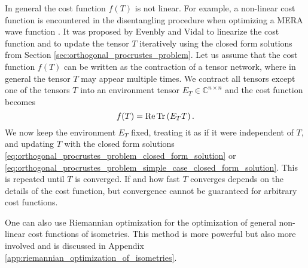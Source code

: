 In general the cost function $f(T)$ is not linear. For example, a non-linear cost function is encountered in the disentangling procedure when optimizing a MERA wave function \cite{cite:algorithms_for_entanglement_renormalization}. It was proposed by Evenbly and Vidal \cite{cite:algorithms_for_entanglement_renormalization, cite:algorithms_for_entanglement_renormalization_boundaries_impurities_interfaces} to linearize the cost function and to update the tensor $T$ iteratively using the closed form solutions from Section \ref{sec:orthogonal_procrustes_problem}. Let us assume that the cost function $f(T)$ can be written as the contraction of a tensor network, where in general the tensor $T$ may appear multiple times. We contract all tensors except one of the tensors $T$ into an environment tensor $E_T \in\mathbb{C}^{n\times n}$ and the cost function becomes
\begin{equation}
	f(T)=\operatorname{Re}\operatorname{Tr}\left(E_TT\right).
\end{equation}
We now keep the environment $E_T$ fixed, treating it as if it were independent of $T$, and updating $T$ with the closed form solutions \eqref{eq:orthogonal_procrustes_problem_closed_form_solution} or \eqref{eq:orthogonal_procrustes_problem_simple_case_closed_form_solution}. This is repeated until $T$ is converged. If and how fast $T$ converges depends on the details of the cost function, but convergence cannot be guaranteed for arbitrary cost functions. \par
One can also use Riemannian optimization for the optimization of general non-linear cost functions of isometries. This method is more powerful but also more involved and is discussed in Appendix \ref{app:riemannian_optimization_of_isometries}.